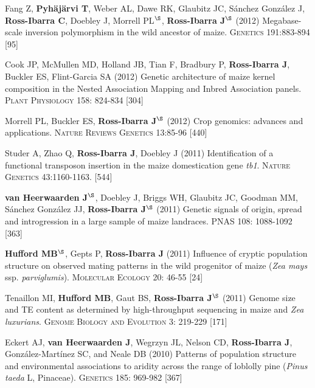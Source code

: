 \documentclass[letterpaper,10pt]{article}
\begin{document}
\begin{etaremune}
\item Fang Z, {\bf Pyh\"aj\"arvi T}, Weber AL, Dawe RK, Glaubitz JC, S\'{a}nchez Gonz\'{a}lez J, {\bf Ross-Ibarra C}, Doebley J, Morrell PL$^\S$, {\bf Ross-Ibarra J}$^\S$  (2012) Megabase-scale inversion polymorphism in the wild ancestor of maize. \textsc{Genetics} 191:883-894
 [95]\\


\item Cook JP, McMullen MD, Holland JB, Tian F, Bradbury P, {\bf Ross-Ibarra J}, Buckler ES, Flint-Garcia SA (2012) Genetic architecture of maize kernel composition in the Nested Association Mapping and Inbred Association panels. \textsc{Plant Physiology} 158: 824-834
 [304]\\

\item Morrell PL, Buckler ES, {\bf Ross-Ibarra J}$^\S$ (2012) Crop genomics: advances and applications.  \textsc{Nature Reviews Genetics} 13:85-96 %
 [440]\\


\item Studer A, Zhao Q, {\bf Ross-Ibarra J}, Doebley J (2011) Identification of a functional transposon insertion in the maize domestication gene \emph{tb1}.  \textsc{Nature Genetics} 43:1160-1163.
 [544]\\


\item {\bf van Heerwaarden J}$^\S$, Doebley J, Briggs WH, Glaubitz JC, Goodman MM, S\'{a}nchez Gonz\'{a}lez JJ, {\bf Ross-Ibarra J}$^\S$ (2011) Genetic signals of origin, spread and introgression in a large sample of maize landraces. PNAS 108: 1088-1092
 [363]\\


\item {\bf Hufford MB}$^\S$, Gepts P, {\bf Ross-Ibarra J} (2011) Influence of cryptic population structure on observed mating patterns in the wild progenitor of maize (\emph{Zea mays} ssp. \emph{parviglumis}).  \textsc{Molecular Ecology} 20: 46-55
 [24]\\


\item Tenaillon MI, {\bf Hufford MB}, Gaut BS, {\bf Ross-Ibarra J}$^\S$ (2011)  Genome size and TE content as determined by high-throughput sequencing in maize and \emph{Zea luxurians}.  \textsc{Genome Biology and Evolution } 3: 219-229
 [171]\\


\item Eckert AJ, {\bf van Heerwaarden J}, Wegrzyn JL, Nelson CD, {\bf Ross-Ibarra J}, Gonz\'{a}lez-Mart\'{i}nez SC, and Neale DB (2010) Patterns of population structure and environmental associations to aridity across the range of loblolly pine (\emph{Pinus taeda} L, Pinaceae).  \textsc{Genetics} 185: 969-982
 [367]\\



\end{etaremune}
\end{document}
